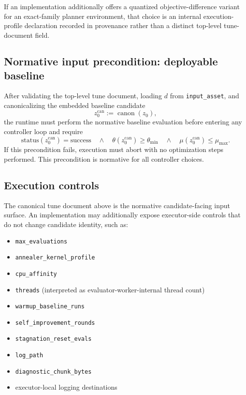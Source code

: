 \documentclass[11pt]{article}
\begin{document}
If an implementation additionally offers a quantized objective-difference
variant for an exact-family planner environment, that choice is an internal
execution-profile declaration recorded in provenance rather than a distinct
top-level tune-document field.

\subsection{Normative input precondition: deployable baseline}\label{subsec:baseline-precondition}

After validating the top-level tune document, loading $d$ from
\texttt{input\_asset}, and canonicalizing the embedded baseline candidate
\[
z_0^{\mathrm{can}}:=\operatorname{canon}(z_0),
\]
the runtime must perform the normative baseline evaluation before entering any
controller loop and require
\[
\mathrm{status}(z_0^{\mathrm{can}})=\mathrm{success}
\quad\land\quad
\theta(z_0^{\mathrm{can}})\ge\theta_{\min}
\quad\land\quad
\mu(z_0^{\mathrm{can}})\le\mu_{\max}.
\]
If this precondition fails, execution must abort with no optimization steps
performed. This precondition is normative for all controller choices.

\subsection{Execution controls}

The canonical tune document above is the normative candidate-facing input
surface. An implementation may additionally expose executor-side controls that
do not change candidate identity, such as:
\begin{itemize}
    \item \texttt{max\_evaluations}
    \item \texttt{annealer\_kernel\_profile}
    \item \texttt{cpu\_affinity}
    \item \texttt{threads} (interpreted as evaluator-worker-internal thread count)
    \item \texttt{warmup\_baseline\_runs}
    \item \texttt{self\_improvement\_rounds}
    \item \texttt{stagnation\_reset\_evals}
    \item \texttt{log\_path}
    \item \texttt{diagnostic\_chunk\_bytes}
    \item executor-local logging destinations
\end{itemize}
\end{document}
